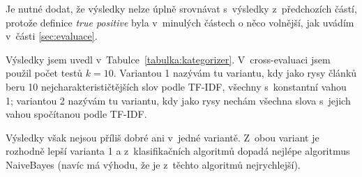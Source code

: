 \documentclass[12pt,a4paper]{report}
\begin{document}
Je nutné dodat, že výsledky nelze úplně srovnávat s~výsledky z~předchozích částí, protože definice \emph{true positive} byla v~minulých částech o něco volnější, jak uvádím v~části \ref{sec:evaluace}.

\label{sec:neomezene}



Výsledky jsem uvedl v~Tabulce~\ref{tabulka:kategorizer}. V~cross-evaluaci jsem použil počet testů $k=10$. Variantou 1 nazývám tu variantu, kdy jako rysy článků beru 10 nej\-cha\-rak\-te\-ri\-sti\-čtěj\-ších slov podle TF-IDF, všechny s~konstantní vahou 1; variantou 2 nazývám tu variantu, kdy jako rysy nechám všechna slova s~jejich vahou spočítanou podle TF-IDF.

Výsledky však nejsou příliš dobré ani v~jedné variantě. Z~obou variant je rozhodně lepší varianta 1 a z~klasifikačních algoritmů dopadá nejlépe algoritmus NaiveBayes (navíc má výhodu, že je z~těchto algoritmů nejrychlejší).
\end{document}
